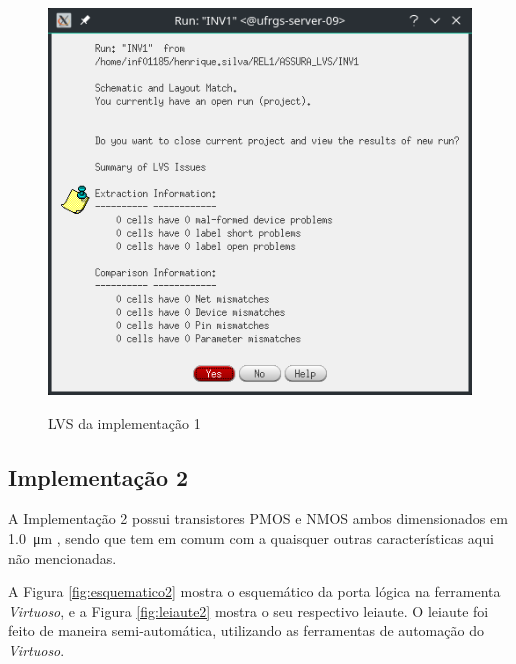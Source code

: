 \documentclass{iiufrgs}
\newcommand{\virtuoso}{\textit{Virtuoso}}
\begin{document}
\begin{figure}[htbp]
    \centering
    \caption{LVS da implementação 1}
    \includegraphics[scale=0.8]{images/LVS_2.png}
    \label{fig:LVS1}
\end{figure}

\FloatBarrier

\subsection{Implementação 2}\label{impl2}
A Implementação 2 possui transistores PMOS e NMOS ambos dimensionados em \SI{1.0}{\um} , sendo que tem em comum com a  quaisquer outras características aqui não mencionadas.\

A Figura \ref{fig:esquematico2} mostra o esquemático da porta lógica na ferramenta \virtuoso, e a Figura \ref{fig:leiaute2} mostra o seu respectivo leiaute. O leiaute foi feito de maneira semi-automática, utilizando as ferramentas de automação do \virtuoso.
\end{document}
